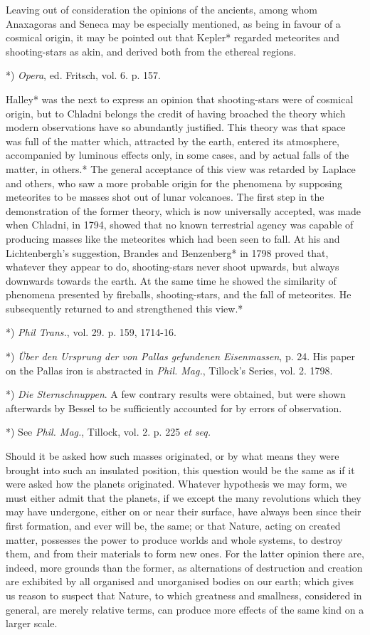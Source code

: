 \documentclass[a4paper, 12pt, oneside, polutonikogreek, english]{article}
\begin{document}
Leaving out of consideration the opinions of the ancients, among whom Anaxagoras and Seneca may be especially mentioned, as being in favour of a cosmical origin, it may be pointed out that Kepler* regarded meteorites and shooting-stars as akin, and derived both from the ethereal regions.

*) \emph{Opera}, ed. Fritsch, vol. 6. p. 157.

Halley* was the next to express an opinion that shooting-stars were of cosmical origin, but to Chladni belongs the credit of having broached the theory which modern observations have so abundantly justified. This theory was that space was full of the matter which, attracted by the earth, entered its atmosphere, accompanied by luminous effects only, in some cases, and by actual falls of the matter, in others.* The general acceptance of this view was retarded by Laplace and others, who saw a more probable origin for the phenomena by supposing meteorites to be masses shot out of lunar volcanoes. The first step in the demonstration of the former theory, which is now universally accepted, was made when Chladni, in 1794, showed that no known terrestrial agency was capable of producing masses like the meteorites which had been seen to fall. At his and Lichtenbergh's suggestion, Brandes and Benzenberg* in 1798 proved that, whatever they appear to do, shooting-stars never shoot upwards, but always downwards towards the earth. At the same time he showed the similarity of phenomena presented by fireballs, shooting-stars, and the fall of meteorites. He subsequently returned to and strengthened this view.*

*) \emph{Phil Trans.}, vol. 29. p. 159, 1714-16.

*) \emph{Über den Ursprung der von Pallas gefundenen Eisenmassen}, p. 24. His paper on the Pallas iron is abstracted in \emph{Phil. Mag.}, Tillock's Series, vol. 2. 1798.

*) \emph{Die Sternschnuppen}. A few contrary results were obtained, but were shown afterwards by Bessel to be sufficiently accounted for by errors of observation.

*) See \emph{Phil. Mag.}, Tillock, vol. 2. p. 225 \emph{et seq.}

Should it be asked how such masses originated, or by what means they were brought into such an insulated position, this question would be the same as if it were asked how the planets originated. Whatever hypothesis we may form, we must either admit that the planets, if we except the many revolutions which they may have undergone, either on or near their surface, have always been since their first formation, and ever will be, the same; or that Nature, acting on created matter, possesses the power to produce worlds and whole systems, to destroy them, and from their materials to form new ones. For the latter opinion there are, indeed, more grounds than the former, as alternations of destruction and creation are exhibited by all organised and unorganised bodies on our earth; which gives us reason to suspect that Nature, to which greatness and smallness, considered in general, are merely relative terms, can produce more effects of the same kind on a larger scale.
\end{document}
